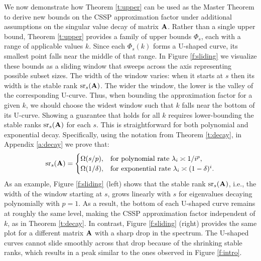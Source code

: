 \documentclass{article}
\begin{document}
We now demonstrate how Theorem \ref{t:upper} can be used as the Master Theorem to derive new
bounds on the CSSP approximation factor under additional assumptions
on the singular value decay of matrix $\mathbf A$. Rather than a single upper
bound, Theorem \ref{t:upper} provides a family of upper bounds
$\Phi_s$, each with a range of applicable values $k$. Since each
$\Phi_s(k)$ forms a U-shaped curve, its smallest point falls near the
middle of that range. In Figure \ref{f:sliding} we visualize these bounds as a sliding
window that sweeps across the axis representing possible subset
sizes. The width of the window varies: when it starts at $s$ 
then its width is the stable rank ${\mathrm{sr}}_s(\mathbf A)$. The wider the window,
the lower is the valley of the corresponding U-curve. Thus, when
bounding the approximation factor for a given $k$, we should choose
the widest window such that $k$ falls near the bottom of its
U-curve. Showing a guarantee that holds for all $k$ requires lower-bounding the
stable ranks ${\mathrm{sr}}_s(\mathbf A)$ for each $s$. This is straightforward for
both polynomial and exponential decay. Specifically, using the
notation from Theorem \ref{t:decay}, in Appendix \ref{a:decay} we
prove that: %
\begin{align*}
  {\mathrm{sr}}_s(\mathbf A) =
  \begin{cases}
    \Omega(s/p), &\text{for polynomial rate  $\lambda_i\asymp1/i^p$},\\
    \Omega(1/\delta),&\text{for exponential rate $\lambda_i\asymp(1-\delta)^i$}.
    \end{cases}
  \end{align*}
As an example, Figure \ref{f:sliding} (left) shows that the stable rank ${\mathrm{sr}}_s(\mathbf A)$, i.e.,
the width of the window starting at $s$, grows linearly with $s$ for eigenvalues
decaying polynomially with $p=1$. As a result, the bottom of each
U-shaped curve remains at roughly the same level, making the CSSP
approximation factor independent of $k$, as in Theorem
\ref{t:decay}. In contrast, Figure \ref{f:sliding} (right) provides
the same plot for a different matrix $\mathbf A$ with a sharp drop in the spectrum. The U-shaped
curves cannot slide smoothly across that drop because of the
shrinking stable ranks, which results in a peak similar to the ones
observed in Figure \ref{f:intro}.


 
\end{document}
